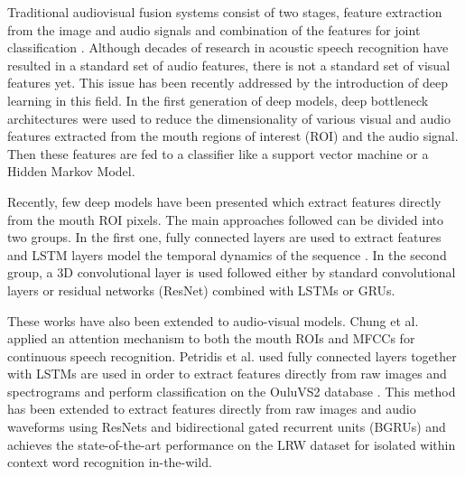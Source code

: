 \documentclass{article}
\begin{document}
Traditional audiovisual fusion systems consist of two stages, feature extraction from the image and audio signals and combination of the features for joint classification \cite{Potamianos2003,Dupont2000,predBasedAVfusion}. Although decades of 
research in acoustic speech recognition have resulted in a standard set of audio features, there is not a standard set of visual features yet. This issue has been recently addressed by the introduction of deep learning in this field. In the first generation of deep models, deep bottleneck architectures \cite{ngiam2011multimodal,hu2016temporal,ninomiya2015integration,mroueh2015,takashima2016audio,petridisPantic_icassp2016} were used to reduce the dimensionality of various visual and audio features extracted from the mouth regions of interest (ROI) and the audio signal. Then these features are fed to a classifier like a support vector machine or a Hidden Markov Model. 

Recently, few deep models have been presented which extract features directly from the mouth ROI pixels. The main approaches followed can be divided into two groups. In the first one, fully connected layers are used to extract features and LSTM layers model the temporal dynamics of the sequence \cite{petridis2017deepVisualSpeech,wand2016lipreading}. In the second group, a 3D convolutional layer is used followed either by standard convolutional layers \cite{assael2016lipnet,shillingford2018large} or residual networks (ResNet) \cite{stafylakis2017combining} combined with LSTMs or GRUs. 

These works have also been extended to audio-visual models. Chung et al. \cite{Chung17cvpr} applied an attention mechanism to both the mouth ROIs and MFCCs for continuous speech recognition. Petridis et al. \cite{end2endAV} used fully connected layers together with LSTMs are used in order to extract features directly from raw images and spectrograms and perform classification on the OuluVS2 database \cite{Anina2015}. This method has been extended to extract features directly from raw images and audio waveforms using ResNets and bidirectional gated recurrent units (BGRUs) \cite{petridis2018end} and achieves the state-of-the-art performance on the LRW dataset \cite{chung2016lip} for isolated within context word recognition in-the-wild.   
\end{document}
